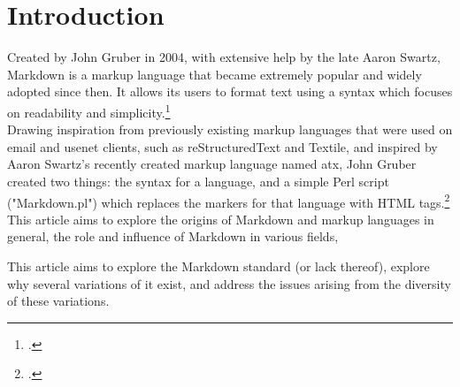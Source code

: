 \chapter{Introduction}

\vspace{1cm}

Created by John Gruber in 2004, with extensive help by the late Aaron Swartz, Markdown is a markup language that became extremely popular
and widely adopted since then. It allows its users to format text using a syntax which focuses on readability and simplicity.\footcite["Syntax" page]{gruber2004markdown}\\

Drawing inspiration from previously existing markup languages that were used on email and usenet clients, such as reStructuredText and Textile,
and inspired by Aaron Swartz's recently created markup language named atx, John Gruber created two things: the syntax for a language, and a simple
Perl script ("Markdown.pl") which replaces the markers for that language with HTML tags.\footcite{gruber2004markdown}\\


This article aims to explore the origins of Markdown and markup languages in general, the role and influence of Markdown in various fields,

This article aims to explore the Markdown standard (or lack thereof), explore why several variations of it exist, and address the issues
arising from the diversity of these variations.